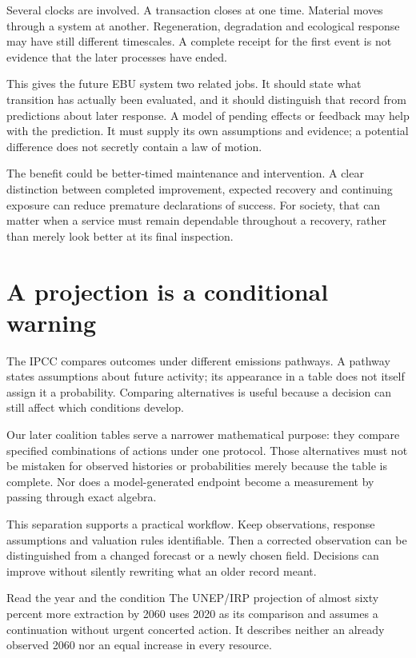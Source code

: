 Several clocks are involved. A transaction closes at one time. Material moves through a system at another. Regeneration, degradation and ecological response may have still different timescales. A complete receipt for the first event is not evidence that the later processes have ended.

This gives the future EBU system two related jobs. It should state what transition has actually been evaluated, and it should distinguish that record from predictions about later response. A model of pending effects or feedback may help with the prediction. It must supply its own assumptions and evidence; a potential difference does not secretly contain a law of motion.

The benefit could be better-timed maintenance and intervention. A clear distinction between completed improvement, expected recovery and continuing exposure can reduce premature declarations of success. For society, that can matter when a service must remain dependable throughout a recovery, rather than merely look better at its final inspection.

\section{A projection is a conditional warning}
The IPCC compares outcomes under different emissions pathways. A pathway states assumptions about future activity; its appearance in a table does not itself assign it a probability.\cite{intro-ipcc} Comparing alternatives is useful because a decision can still affect which conditions develop.

Our later coalition tables serve a narrower mathematical purpose: they compare specified combinations of actions under one protocol. Those alternatives must not be mistaken for observed histories or probabilities merely because the table is complete. Nor does a model-generated endpoint become a measurement by passing through exact algebra.

This separation supports a practical workflow. Keep observations, response assumptions and valuation rules identifiable. Then a corrected observation can be distinguished from a changed forecast or a newly chosen field. Decisions can improve without silently rewriting what an older record meant.

\begin{workedbox}{Read the year and the condition}
The UNEP/IRP projection of almost sixty percent more extraction by 2060 uses 2020 as its comparison and assumes a continuation without urgent concerted action. It describes neither an already observed 2060 nor an equal increase in every resource.
\end{workedbox}


